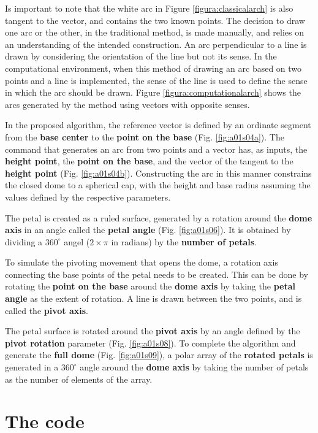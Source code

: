 \documentclass[preprint,12pt,3p]{elsarticle}
\begin{document}
Is important to note that the white arc in Figure \ref{figura:classicalarch} is also tangent to the vector, and contains the two known points. The decision to draw one arc or the other, in the traditional method, is made manually, and relies on an understanding of the intended construction. An arc perpendicular to a line is drawn by considering the orientation of the line but not its sense. In the computational environment, when this method of drawing an arc based on two points and a line is implemented, the sense of the line is used to define the sense in which the arc should be drawn. Figure \ref{figura:computationalarch} shows the arcs generated by the method using vectors with opposite senses.

In the proposed algorithm, the reference vector is defined by an ordinate segment from the \textbf{base center} to the \textbf{point on the base} (Fig. \ref{fig:a01s04a}). The command that generates an arc from two points and a vector has, as inputs, the \textbf{height point}, the \textbf{point on the base}, and the vector of the tangent to the \textbf{height point} (Fig. \ref{fig:a01s04b}). Constructing the arc in this manner constrains the closed dome to a spherical cap, with the height and base radius assuming the values defined by the respective parameters.

The petal is created as a ruled surface, generated by a rotation around the \textbf{dome axis} in an angle called the \textbf{petal angle} (Fig. \ref{fig:a01s06}). It is obtained by dividing a $360 ^{\circ}$ angel ($2 \times \pi $ in radians) by the \textbf{number of petals}. 

To simulate the pivoting movement that opens the dome, a rotation axis connecting the base points of the petal needs to be created. This can be done by rotating the \textbf{point on the base} around the \textbf{dome axis} by taking the \textbf{petal angle} as the extent of rotation. A line is drawn between the two points, and is called the \textbf{pivot axis}.

The petal surface is rotated around the \textbf{pivot axis} by an angle defined by the \textbf{pivot rotation} parameter (Fig. \ref{fig:a01s08}). To complete the algorithm and generate the \textbf{full dome} (Fig. \ref{fig:a01s09}), a polar array of the \textbf{rotated petals} is generated in a $360 ^{\circ}$ angle around the \textbf{dome axis} by taking the number of petals as the number of elements of the array.

\section{The code}
\label{code}
\end{document}
